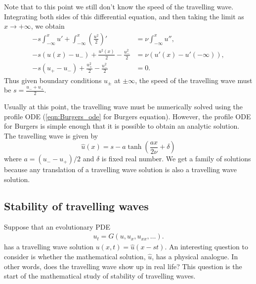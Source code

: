 Note that to this point we still don't know the speed of the travelling wave.
Integrating both sides of this differential equation, and then taking the limit as $x \to +\infty$, we obtain
\begin{align*}
-s\int_{-\infty}^x u' + \int_{-\infty}^x \left(\frac{u^2}{2}\right)' &= \nu \int_{-\infty}^x u'',\\
-s(u(x) - u_-) + \frac{u^2(x)}{2} - \frac{u_-^2}{2} &= \nu (u'(x) - u'(-\infty)), \\
-s(u_+ - u_-) + \frac{u_+^2}{2} - \frac{u_-^2}{2} &= 0.
\end{align*}
Thus given boundary conditions $u_{\pm}$ at $\pm \infty$, the speed of the travelling wave must be $s = \frac{u_- + u_+}{2}$.

Usually at this point, the travelling wave must be numerically solved using the profile ODE (\eqref{eqn:Burgers_ode} for Burgers equation).
However, the profile ODE for Burgers is simple enough that it is possible to obtain an analytic solution.
The travelling wave is  given by
\[\hat{u}(x) = s - a \tanh \left(\frac{ax }{2\nu} + \delta\right)\]
where $a = (u_- - u_+)/2$ and $\delta$ is fixed real number.
We get a family of solutions because any translation of a travelling wave solution is also a travelling wave solution.

\subsection*{Stability of travelling waves}
Suppose that an evolutionary PDE
\begin{align}
u_t = G(u,u_x, u_{xx}, \ldots).
\label{eqn:evol_pde_repeat}
\end{align}
has a travelling wave solution $u(x,t) = \hat{u}(x-st)$.
An interesting question to consider is whether the mathematical solution, $\hat{u}$, has a physical analogue.
In other words, does the travelling wave show up in real life?
This question is the start of the mathematical study of stability of travelling waves.

